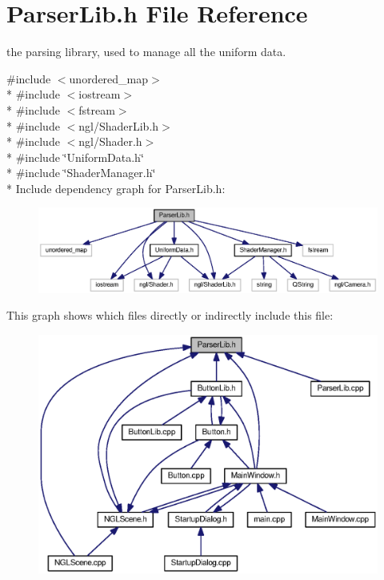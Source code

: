 \section{Parser\-Lib.\-h File Reference}
\label{_parser_lib_8h}


the parsing library, used to manage all the uniform data.  


{\ttfamily \#include $<$unordered\-\_\-map$>$}\\*
{\ttfamily \#include $<$iostream$>$}\\*
{\ttfamily \#include $<$fstream$>$}\\*
{\ttfamily \#include $<$ngl/\-Shader\-Lib.\-h$>$}\\*
{\ttfamily \#include $<$ngl/\-Shader.\-h$>$}\\*
{\ttfamily \#include \char`\"{}Uniform\-Data.\-h\char`\"{}}\\*
{\ttfamily \#include \char`\"{}Shader\-Manager.\-h\char`\"{}}\\*
Include dependency graph for Parser\-Lib.\-h\-:
\nopagebreak
\begin{figure}[H]
\begin{center}
\leavevmode
\includegraphics[width=350pt]{_parser_lib_8h__incl}
\end{center}
\end{figure}
This graph shows which files directly or indirectly include this file\-:
\nopagebreak
\begin{figure}[H]
\begin{center}
\leavevmode
\includegraphics[width=350pt]{_parser_lib_8h__dep__incl}
\end{center}
\end{figure}

